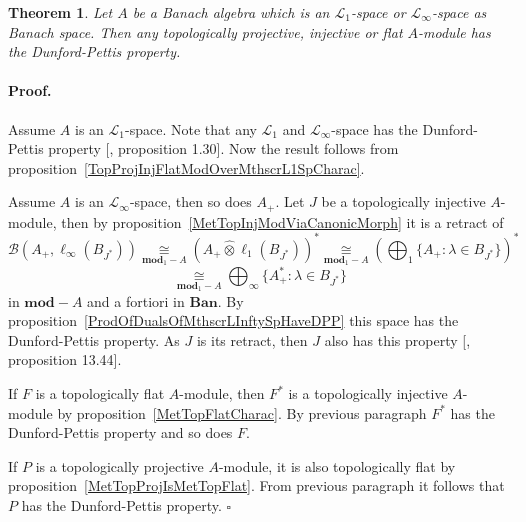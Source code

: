 \documentclass[12pt]{article}
\newcommand{\projtens}{\mathbin{\widehat{\otimes}}}
\newcommand{\isom}[1]{\mathop{\mathbin{\cong}}\limits_{#1}}
\newtheorem{theorem}{Theorem}[section]
\renewenvironment{proof}{\paragraph{Proof.}}{\hfill$\square$\medskip}
\begin{document}
\begin{theorem}\label{TopProjInjFlatModOverMthscrL1OrLInftySpHaveDPP} Let $A$ be
    a Banach algebra which is an $\mathscr{L}_1$-space or
    $\mathscr{L}_\infty$-space as Banach space. Then any topologically
    projective, injective or flat $A$-module has the Dunford-Pettis property.
\end{theorem}
\begin{proof} Assume $A$ is an $\mathscr{L}_1$-space. Note that any
    $\mathscr{L}_1$ and $\mathscr{L}_\infty$-space has the Dunford-Pettis
    property [\cite{BourgNewClOfLpSp}, proposition 1.30]. Now the result follows
    from proposition~\ref{TopProjInjFlatModOverMthscrL1SpCharac}.

    Assume $A$ is an $\mathscr{L}_\infty$-space, then so does $A_+$. Let $J$ be
    a topologically injective $A$-module, then by
    proposition~\ref{MetTopInjModViaCanonicMorph} it is a retract of
    $$
        \mathcal{B}(A_+,\ell_\infty(B_{J^*}))
        \isom{\mathbf{mod}_1-A}{(A_+\projtens\ell_1(B_{J^*}))}^*\isom{\mathbf{mod}_1-A}
        {\left(\bigoplus\nolimits_1\{ A_+:\lambda\in B_{J^*}\}\right)}^*
    $$
    $$
        \isom{\mathbf{mod}_1-A}
        \bigoplus\nolimits_\infty \{ A_+^*:\lambda\in B_{J^*} \}
    $$
    in $\mathbf{mod}-A$ and a fortiori in $\mathbf{Ban}$. By
    proposition~\ref{ProdOfDualsOfMthscrLInftySpHaveDPP} this space has the
    Dunford-Pettis property. As $J$ is its retract, then $J$ also has this
    property [\cite{FabHabBanSpTh}, proposition 13.44].

    If $F$ is a topologically flat $A$-module, then $F^*$ is a topologically
    injective $A$-module by proposition~\ref{MetTopFlatCharac}. By previous
    paragraph $F^*$ has the Dunford-Pettis property and so does $F$.

    If $P$ is a topologically projective $A$-module, it is also topologically
    flat by proposition~\ref{MetTopProjIsMetTopFlat}. From previous paragraph it
    follows that $P$ has the Dunford-Pettis property.
\end{proof}
\end{document}
